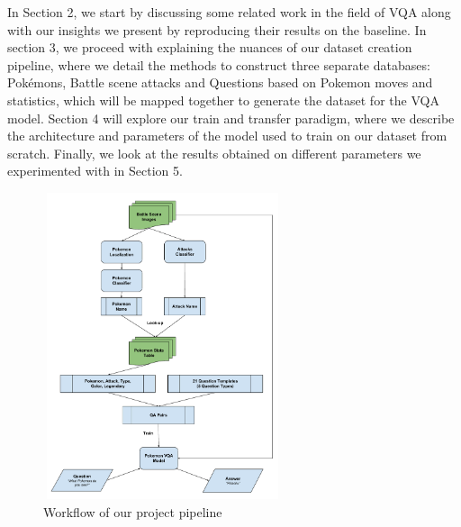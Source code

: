 \documentclass[journal, a4paper]{IEEEtran}
\begin{document}
	In Section 2, we start by discussing some related work in the field of VQA along with our insights we present by reproducing their results on the baseline. In section 3, we proceed with explaining the nuances of our dataset creation pipeline, where we detail the methods to construct three separate databases: Pok\'emons, Battle scene attacks and Questions based on Pokemon moves and statistics, which will be mapped together to generate the dataset for the VQA model.
    Section 4 will explore our train and transfer paradigm, where we describe the architecture and parameters of the model used to train on our dataset from scratch. Finally, we look at the results obtained on different parameters we experimented with in Section 5.
    \begin{figure}[ht]
    \caption{Workflow of our project pipeline}
\centering
    \includegraphics[scale = 0.6, width=7cm, height=9cm]{VQA_Pokemon_Workflow.pdf}
    \end{figure}

\end{document}
